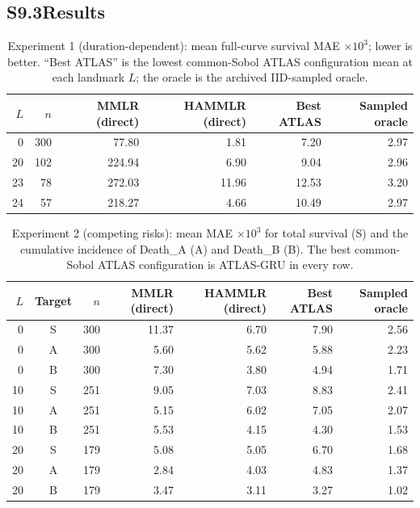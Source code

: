 \documentclass[11pt]{article}
\begin{document}
\subsection*{S9.3\quad Results}

\begin{table}[h]
\centering
\caption{Experiment 1 (duration-dependent): mean full-curve survival MAE $\times 10^{3}$; lower is better. ``Best ATLAS'' is the lowest common-Sobol ATLAS configuration mean at each landmark $L$; the oracle is the archived IID-sampled oracle.}
\label{tab:exp1}
\begin{tabular}{rrrrrr}
\toprule
$L$ & $n$ & MMLR (direct) & HAMMLR (direct) & Best ATLAS & Sampled oracle \\
\midrule
0  & 300 & 77.80  & 1.81  & 7.20  & 2.97 \\
20 & 102 & 224.94 & 6.90  & 9.04  & 2.96 \\
23 & 78  & 272.03 & 11.96 & 12.53 & 3.20 \\
24 & 57  & 218.27 & 4.66  & 10.49 & 2.97 \\
\bottomrule
\end{tabular}
\end{table}

\begin{table}[h]
\centering
\caption{Experiment 2 (competing risks): mean MAE $\times 10^{3}$ for total survival (S) and the cumulative incidence of Death\_A (A) and Death\_B (B). The best common-Sobol ATLAS configuration is ATLAS-GRU in every row.}
\label{tab:exp2}
\begin{tabular}{rcrrrrr}
\toprule
$L$ & Target & $n$ & MMLR (direct) & HAMMLR (direct) & Best ATLAS & Sampled oracle \\
\midrule
0  & S & 300 & 11.37 & 6.70 & 7.90 & 2.56 \\
0  & A & 300 & 5.60  & 5.62 & 5.88 & 2.23 \\
0  & B & 300 & 7.30  & 3.80 & 4.94 & 1.71 \\
10 & S & 251 & 9.05  & 7.03 & 8.83 & 2.41 \\
10 & A & 251 & 5.15  & 6.02 & 7.05 & 2.07 \\
10 & B & 251 & 5.53  & 4.15 & 4.30 & 1.53 \\
20 & S & 179 & 5.08  & 5.05 & 6.70 & 1.68 \\
20 & A & 179 & 2.84  & 4.03 & 4.83 & 1.37 \\
20 & B & 179 & 3.47  & 3.11 & 3.27 & 1.02 \\
\bottomrule
\end{tabular}
\end{table}
\end{document}
